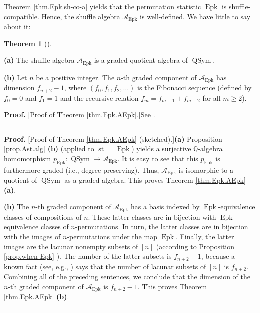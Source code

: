 \documentclass[numbers=enddot,12pt,final,onecolumn,notitlepage]{scrartcl}%
\theoremstyle{definition}
\newtheorem{theo}{Theorem}[section]
\newenvironment{theorem}[1][]
{\begin{theo}[#1]\begin{leftbar}}
{\end{leftbar}\end{theo}}
\newenvironment{proof}[1][Proof]{\noindent\textbf{#1.} }{\ \rule{0.5em}{0.5em}}
\newenvironment{verlong}{}{}
\newenvironment{vershort}{}{}
\begin{document}
Theorem \ref{thm.Epk.sh-co-a} yields that the permutation statistic
$\operatorname*{Epk}$ is shuffle-compatible. Hence, the shuffle algebra
$\mathcal{A}_{\operatorname*{Epk}}$ is well-defined. We have little to say
about it:

\begin{theorem}
\label{thm.Epk.AEpk}\textbf{(a)} The shuffle algebra $\mathcal{A}%
_{\operatorname*{Epk}}$ is a graded quotient algebra of $\operatorname*{QSym}$.

\textbf{(b)} Let $n$ be a positive integer. The $n$-th graded component of
$\mathcal{A}_{\operatorname*{Epk}}$ has dimension $f_{n+2}-1$, where $\left(
f_{0},f_{1},f_{2},\ldots\right)  $ is the Fibonacci sequence (defined by
$f_{0}=0$ and $f_{1}=1$ and the recursive relation $f_{m}=f_{m-1}+f_{m-2}$ for
all $m\geq2$).
\end{theorem}

\begin{vershort}
\begin{proof}
[Proof of Theorem \ref{thm.Epk.AEpk}.]See \cite{verlong}.
\end{proof}
\end{vershort}

\begin{verlong}
\begin{proof}
[Proof of Theorem \ref{thm.Epk.AEpk} (sketched).]\textbf{(a)} Proposition
\ref{prop.Ast.alg} \textbf{(b)} (applied to $\operatorname*{st}%
=\operatorname*{Epk}$) yields a surjective $\mathbb{Q}$-algebra homomorphism
$p_{\operatorname*{Epk}}:\operatorname*{QSym}\rightarrow\mathcal{A}%
_{\operatorname*{Epk}}$. It is easy to see that this $p_{\operatorname*{Epk}}$
is furthermore graded (i.e., degree-preserving). Thus, $\mathcal{A}%
_{\operatorname*{Epk}}$ is isomorphic to a quotient of $\operatorname*{QSym}$
as a graded algebra. This proves Theorem \ref{thm.Epk.AEpk} \textbf{(a)}.

\textbf{(b)} The $n$-th graded component of $\mathcal{A}_{\operatorname*{Epk}%
}$ has a basis indexed by $\operatorname*{Epk}$-equivalence classes of
compositions of $n$. These latter classes are in bijection with
$\operatorname*{Epk}$-equivalence classes of $n$-permutations. In turn, the
latter classes are in bijection with the images of $n$-permutations under the
map $\operatorname*{Epk}$. Finally, the latter images are the lacunar nonempty
subsets of $\left[  n\right]  $ (according to Proposition \ref{prop.when-Epk}%
). The number of the latter subsets is $f_{n+2}-1$, because a known fact (see,
e.g., \cite[Exercise 1.35 \textbf{a.}]{Stanley-EC1}) says that the number of
lacunar subsets of $\left[  n\right]  $ is $f_{n+2}$. Combining all of the
preceding sentences, we conclude that the dimension of the $n$-th graded
component of $\mathcal{A}_{\operatorname*{Epk}}$ is $f_{n+2}-1$. This proves
Theorem \ref{thm.Epk.AEpk} \textbf{(b)}.
\end{proof}
\end{verlong}
\end{document}

